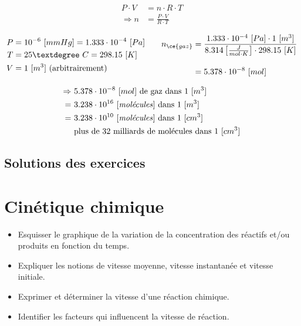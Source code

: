 \documentclass[
  11pt,
  french,
  a4paper,
  openany]{book}
\providecommand{\tightlist}{%
  \setlength{\itemsep}{0pt}\setlength{\parskip}{0pt}}
\begin{document}
\begin{Answer}
\[
\begin{split}
    P \cdot V &= n \cdot R \cdot T \\
    \Rightarrow n &= \frac{P \cdot V}{R \cdot T}
\end{split}
\]

\[
\begin{split}
    P &= 10^{-6}\ [mmHg] = 1.333 \cdot 10^{-4}\ [Pa] \\
    T &= 25°\ C = 298.15\ [K] \\
    V &= 1\ [m^3] \text{ (arbitrairement)}
\end{split}
\qquad
\begin{split}
    n_{\ce{gaz}} &= \frac{1.333 \cdot 10^{-4}\ [Pa] \cdot 1\ [m^3]}{8.314 \left[\frac{J}{mol \cdot K}\right] \cdot 298.15\ [K]} \\[1em]
    & = 5.378 \cdot 10^{-8}\ [mol]
\end{split}
\]

\[
\begin{split}
    \Rightarrow\ & 5.378 \cdot 10^{-8}\ [mol] \text{ de gaz dans 1 [$m^3$]} \\
    =\ & 3.238 \cdot 10^{16} \text{ [\textit{molécules}] dans 1 [$m^3$]} \\
    =\ & 3.238 \cdot 10^{10} \text{ [\textit{molécules}] dans 1 [$cm^3$]} \\
    & \text{plus de 32 milliards de molécules dans 1 [$cm^3$]}
\end{split}
\]

\end{Answer}

\newpage

\section{Solutions des exercices} \shipoutAnswer

\hypertarget{cinuxe9tique-chimique}{%
\chapter{Cinétique chimique}\label{cinuxe9tique-chimique}}

\begin{objectives}

\begin{itemize}
\tightlist
\item
  Esquisser le graphique de la variation de la concentration des réactifs et/ou produits en fonction du temps.
\item
  Expliquer les notions de vitesse moyenne, vitesse instantanée et vitesse initiale.
\item
  Exprimer et déterminer la vitesse d'une réaction chimique.
\item
  Identifier les facteurs qui influencent la vitesse de réaction.
\end{itemize}


\end{objectives}
\end{document}
